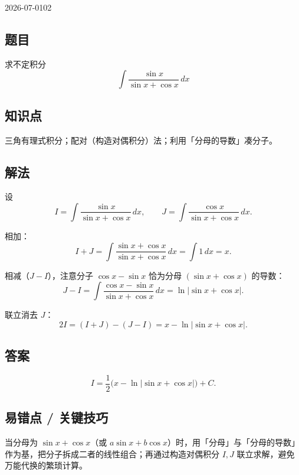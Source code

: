 \begin{mistake}{2026-07-01}{02}
\subsection*{题目}
求不定积分
\[
\int \frac{\sin x}{\sin x + \cos x}\,dx
\]

\subsection*{知识点}
三角有理式积分；配对（构造对偶积分）法；利用「分母的导数」凑分子。

\subsection*{解法}
设
\[
I = \int \frac{\sin x}{\sin x + \cos x}\,dx,\qquad
J = \int \frac{\cos x}{\sin x + \cos x}\,dx.
\]

相加：
\[
I + J = \int \frac{\sin x + \cos x}{\sin x + \cos x}\,dx = \int 1\,dx = x.
\]

相减（$J-I$），注意分子 $\cos x-\sin x$ 恰为分母 $(\sin x+\cos x)$ 的导数：
\[
J - I = \int \frac{\cos x - \sin x}{\sin x + \cos x}\,dx = \ln|\sin x + \cos x|.
\]

联立消去 $J$：
\[
2I = (I+J) - (J-I) = x - \ln|\sin x + \cos x|.
\]

\subsection*{答案}
\[
I = \frac{1}{2}\Big(x - \ln|\sin x + \cos x|\Big) + C.
\]

\subsection*{易错点 / 关键技巧}
当分母为 $\sin x + \cos x$（或 $a\sin x + b\cos x$）时，用「分母」与「分母的导数」作为基，把分子拆成二者的线性组合；再通过构造对偶积分 $I,J$ 联立求解，避免万能代换的繁琐计算。
\end{mistake}
